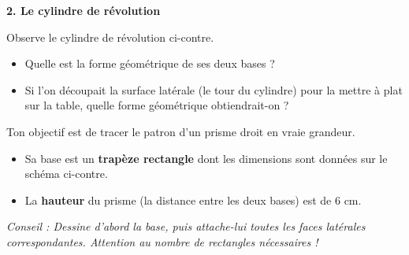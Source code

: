 \documentclass[a4paper]{book}
\begin{document}
\begin{exercice}
        \vspace{0.4cm}
    
        \textbf{2. Le cylindre de révolution} \\
        \begin{minipage}{0.55\textwidth}
            Observe le cylindre de révolution ci-contre.
            \begin{itemize}
                \item Quelle est la forme géométrique de ses deux bases ? \dotfill
                \item Si l'on découpait la surface latérale (le tour du cylindre) pour la mettre à plat sur la table, quelle forme géométrique obtiendrait-on ? \dotfill
            \end{itemize}
        \end{minipage}
        \hfill
        \begin{minipage}{0.4\textwidth}
            \centering
        \end{minipage}
    \end{exercice}


    \begin{exercice}
        \begin{minipage}{0.65\textwidth}
            Ton objectif est de tracer le patron d'un prisme droit en vraie grandeur.
            \begin{itemize}
                \item Sa base est un \textbf{trapèze rectangle} dont les dimensions sont données sur le schéma ci-contre.
                \item La \textbf{hauteur} du prisme (la distance entre les deux bases) est de \textbf{$6\text{ cm}$}.
            \end{itemize}
            \textit{Conseil : Dessine d'abord la base, puis attache-lui toutes les faces latérales correspondantes. Attention au nombre de rectangles nécessaires !}
        \end{minipage}
        \hfill
        \begin{minipage}{0.3\textwidth}
            \centering
        \end{minipage}
    \end{exercice}
\end{document}
